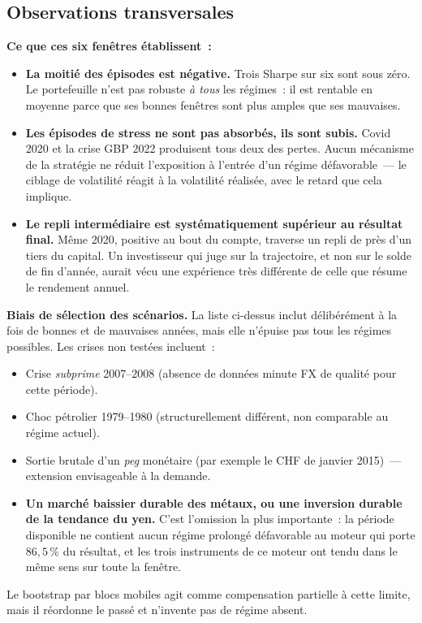 \subsection{Observations transversales}

\begin{insightbox}
\textbf{Ce que ces six fenêtres établissent~:}
\begin{itemize}
\item \textbf{La moitié des épisodes est négative.} Trois Sharpe sur six sont sous zéro. Le portefeuille n'est pas robuste \emph{à tous} les régimes~: il est rentable en moyenne parce que ses bonnes fenêtres sont plus amples que ses mauvaises.
\item \textbf{Les épisodes de stress ne sont pas absorbés, ils sont subis.} Covid 2020 et la crise GBP 2022 produisent tous deux des pertes. Aucun mécanisme de la stratégie ne réduit l'exposition à l'entrée d'un régime défavorable~--- le ciblage de volatilité réagit à la volatilité réalisée, avec le retard que cela implique.
\item \textbf{Le repli intermédiaire est systématiquement supérieur au résultat final.} Même 2020, positive au bout du compte, traverse un repli de près d'un tiers du capital. Un investisseur qui juge sur la trajectoire, et non sur le solde de fin d'année, aurait vécu une expérience très différente de celle que résume le rendement annuel.
\end{itemize}
\end{insightbox}

\begin{warningbox}
\textbf{Biais de sélection des scénarios.} La liste ci-dessus inclut délibérément à la fois de bonnes et de mauvaises années, mais elle n'épuise pas tous les régimes possibles. Les crises non testées incluent~:
\begin{itemize}
\item Crise \emph{subprime} 2007--2008 (absence de données minute FX de qualité pour cette période).
\item Choc pétrolier 1979--1980 (structurellement différent, non comparable au régime actuel).
\item Sortie brutale d'un \emph{peg} monétaire (par exemple le CHF de janvier 2015)~--- extension envisageable à la demande.
\item \textbf{Un marché baissier durable des métaux, ou une inversion durable de la tendance du yen.} C'est l'omission la plus importante~: la période disponible ne contient aucun régime prolongé défavorable au moteur qui porte $86{,}5\,\%$ du résultat, et les trois instruments de ce moteur ont tendu dans le même sens sur toute la fenêtre.
\end{itemize}
Le bootstrap par blocs mobiles agit comme compensation partielle à cette limite, mais il réordonne le passé et n'invente pas de régime absent.
\end{warningbox}
